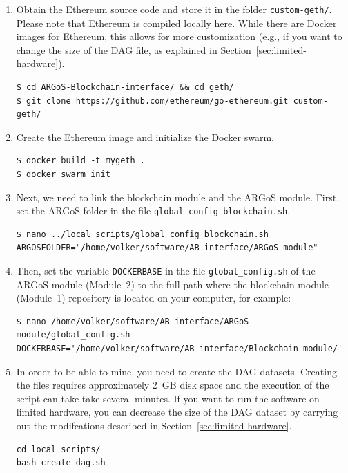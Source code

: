 \documentclass{article}
\begin{document}
\begin{enumerate}
\item Obtain the Ethereum source code and store it in the folder
\verb|custom-geth/|. Please note that Ethereum is compiled locally
here. While there are Docker images for Ethereum, this allows for more
customization (e.g., if you want to change the size of the DAG file,
as explained in Section~\ref{sec:limited-hardware}).

\begin{verbatim}
$ cd ARGoS-Blockchain-interface/ && cd geth/
$ git clone https://github.com/ethereum/go-ethereum.git custom-geth/
\end{verbatim}
\item Create the Ethereum image and initialize the Docker swarm.

\begin{verbatim}
$ docker build -t mygeth .
$ docker swarm init
\end{verbatim}
\item Next, we need to link the blockchain module and the ARGoS module. First, set the ARGoS folder in the file \verb|global_config_blockchain.sh|.

\begin{verbatim}
$ nano ../local_scripts/global_config_blockchain.sh
ARGOSFOLDER="/home/volker/software/AB-interface/ARGoS-module"
\end{verbatim}

\item Then, set the variable \verb|DOCKERBASE| in the file
  \verb|global_config.sh| of the ARGoS module (Module~2) to the full
  path where the blockchain module (Module~1) repository is located on
  your computer, for example:

\begin{verbatim}
$ nano /home/volker/software/AB-interface/ARGoS-module/global_config.sh
DOCKERBASE='/home/volker/software/AB-interface/Blockchain-module/'
\end{verbatim}

\item In order to be able to mine, you need to create the DAG
  datasets. Creating the files requires approximately 2~GB disk space
  and the execution of the script can take take several minutes. If
  you want to run the software on limited hardware, you can decrease
  the size of the DAG dataset by carrying out the modifcations
  described in Section~\ref{sec:limited-hardware}.

\begin{verbatim}
cd local_scripts/
bash create_dag.sh
\end{verbatim}  
  
\end{enumerate}
\end{document}

